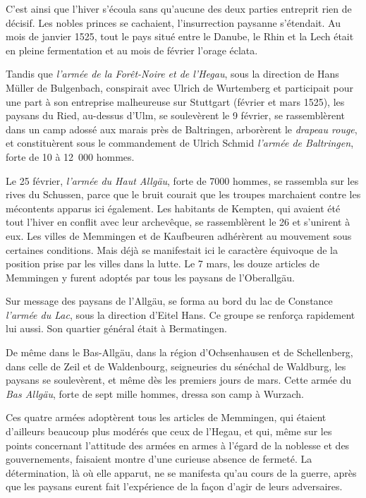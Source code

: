 \documentclass[french,twoside]{book} %
\begin{document}
C’est ainsi que l’hiver s’écoula sans qu’aucune des deux parties entreprit rien de décisif. Les nobles princes se cachaient, l’insurrection paysanne s’étendait. Au mois de janvier 1525, tout le pays situé entre le Danube, le Rhin et la Lech était en pleine fermentation et au mois de février l’orage éclata.\par
Tandis que \emph{l’armée de la Forêt-Noire et de l’Hegau}, sous la direction de Hans Müller de Bulgenbach, conspirait avec Ulrich de Wurtemberg et participait pour une part à son entreprise malheureuse sur Stuttgart (février et mars 1525), les paysans du Ried, au-dessus d’Ulm, se soulevèrent le 9 février, se rassemblèrent dans un camp adossé aux marais près de Baltringen, arborèrent le \emph{drapeau rouge}, et constituèrent sous le commandement de Ulrich Schmid \emph{l’armée de Baltringen}, forte de 10 à 12 000 hommes.\par
Le 25 février, \emph{l’armée du Haut Allgäu}, forte de 7000 hommes, se rassembla sur les rives du Schussen, parce que le bruit courait que les troupes marchaient contre les mécontents apparus ici également. Les habitants de Kempten, qui avaient été tout l’hiver en conflit avec leur archevêque, se rassemblèrent le 26 et s’unirent à eux. Les villes de Memmingen et de Kaufbeuren adhérèrent au mouvement sous certaines conditions. Mais déjà se manifestait ici le caractère équivoque de la position prise par les villes dans la lutte. Le 7 mars, les douze articles de Memmingen y furent adoptés par tous les paysans de l’Oberallgäu.\par
Sur message des paysans de l’Allgäu, se forma au bord du lac de Constance \emph{l’armée du Lac}, sous la direction d’Eitel Hans. Ce groupe se renforça rapidement lui aussi. Son quartier général était à Bermatingen.\par
De même dans le Bas-Allgäu, dans la région d’Ochsenhausen et de Schellenberg, dans celle de Zeil et de Waldenbourg, seigneuries du sénéchal de Waldburg, les paysans se soulevèrent, et même dès les premiers jours de mars. Cette armée du \emph{Bas Allgäu}, forte de sept mille hommes, dressa son camp à Wurzach.\par
Ces quatre armées adoptèrent tous les articles de Memmingen, qui étaient d’ailleurs beaucoup plus modérés que ceux de l’Hegau, et qui, même sur les points concernant l’attitude des armées en armes à l’égard de la noblesse et des gouvernements, faisaient montre d’une curieuse absence de fermeté. La détermination, là où elle apparut, ne se manifesta qu’au cours de la guerre, après que les paysans eurent fait l’expérience de la façon d’agir de leurs adversaires.\par
\end{document}
